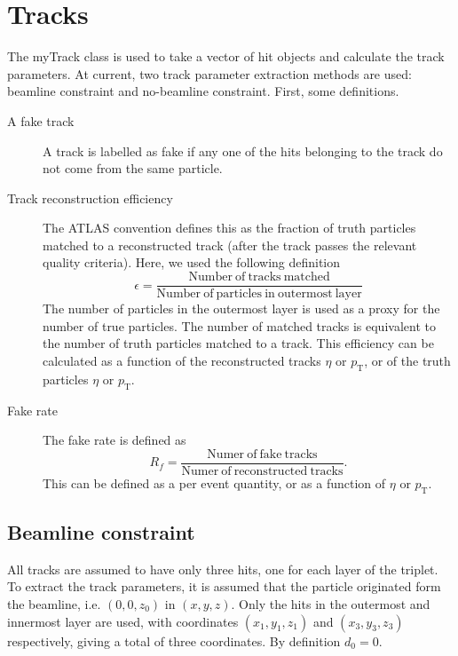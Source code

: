 \documentclass[a4paper, 12pt]{article}
\newcommand{\pt}{\ensuremath{p_{\mathrm{T}}}\xspace}
\begin{document}
\section{Tracks}
The myTrack class is used to take a vector of hit objects and calculate the track parameters. 
At current, two track parameter extraction methods are used: beamline constraint and no-beamline constraint. 
First, some definitions.
\begin{description}
  \item[A fake track]
    A track is labelled as fake if any one of the hits belonging to the track do not come from the same particle.

  \item[Track reconstruction efficiency] 
    The ATLAS convention defines this as the fraction of truth particles matched to a reconstructed track (after the track passes the relevant quality criteria).
    Here, we used the following definition
    \begin{equation}
      \epsilon = \frac{\mathrm{Number~of~tracks~matched}}{\mathrm{Number~of~particles~in~outermost~layer}}
    \end{equation}
    The number of particles in the outermost layer is used as a proxy for the number of true particles. 
    The number of matched tracks is equivalent to the number of truth particles matched to a track. 
    This efficiency can be calculated as a function of the reconstructed tracks $\eta$ or \pt, or of the truth particles $\eta$ or \pt. 

  \item[Fake rate]
    The fake rate is defined as 
    \begin{equation}
      R_f = \frac{\mathrm{Numer~of~fake~tracks}}{\mathrm{Numer~of~reconstructed~tracks}}.
    \end{equation}
    This can be defined as a per event quantity, or as a function of $\eta$ or $\pt$. 

\end{description}

\subsection{Beamline constraint}
All tracks are assumed to have only three hits, one for each layer of the triplet.
To extract the track parameters, it is assumed that the particle originated form the beamline, i.e. $(0, 0, z_0)$ in $(x, y, z)$. 
Only the hits in the outermost and innermost layer are used, with coordinates $(x_1, y_1, z_1)$ and $(x_3, y_3, z_3)$ respectively, giving a total of three coordinates.
By definition $d_0=0$. 
\end{document}

